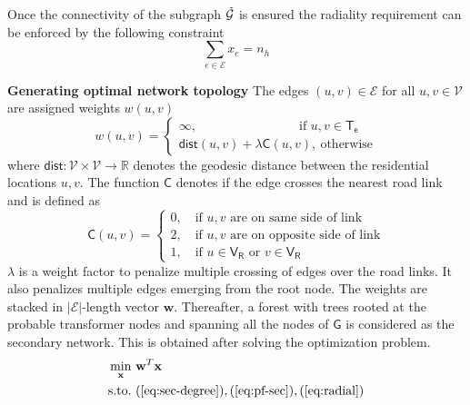 \documentclass[sigconf]{acmart}
\begin{document}
\noindent Once the connectivity of the subgraph $\Tilde{\mathcal{G}}$ is ensured the radiality requirement can be enforced by the following constraint
\begin{equation}
\sum_{e\in\mathcal{E}}x_e=n_h\label{eq:radial}
\end{equation}

\noindent\textbf{Generating optimal network topology}
The edges $(u,v)\in\mathcal{E}$ for all $u,v\in\mathcal{V}$ are assigned weights $w(u,v)$
\begin{equation}
w(u,v)=
\begin{cases}
\infty,\quad\quad\quad\quad\quad\quad\quad\quad\textrm{if }u,v\in\mathsf{T_e}\\
\mathsf{dist}(u,v)+\lambda \mathsf{C}(u,v),~\textrm{otherwise}
\end{cases}
\label{eq:weight}
\end{equation}
where $\mathsf{dist}:\mathcal{V}\times\mathcal{V}\rightarrow\mathbb{R}$ denotes the geodesic distance between the residential locations $u,v$. The function $\mathsf{C}$ denotes if the edge crosses the nearest road link and is defined as
$$
\mathsf{C}(u,v)=
\begin{cases}
0,\quad \textrm{if }u,v\textrm{ are on same side of link}\\
2,\quad \textrm{if }u,v\textrm{ are on opposite side of link}\\
1,\quad \textrm{if }u\in\mathsf{V_R}\textrm{ or }v\in\mathsf{V_R}
\end{cases}
$$
$\lambda$ is a weight factor to penalize multiple crossing of edges over the road links. It also penalizes multiple edges emerging from the root node. The weights are stacked in $|\mathcal{E}|$-length vector $\mathbf{w}$. Thereafter, a forest with trees rooted at the probable transformer nodes and spanning all the nodes of $\mathsf{G}$ is considered as the secondary network. This is obtained after solving the optimization problem.
\begin{equation}
\begin{aligned}
\min_{\mathbf{x}}&~\mathbf{w}^T\mathbf{x}\\
\textrm{s.to.}&~(\ref{eq:sec-degree}),(\ref{eq:pf-sec}),(\ref{eq:radial})
\end{aligned}
\end{equation}
\end{document}
